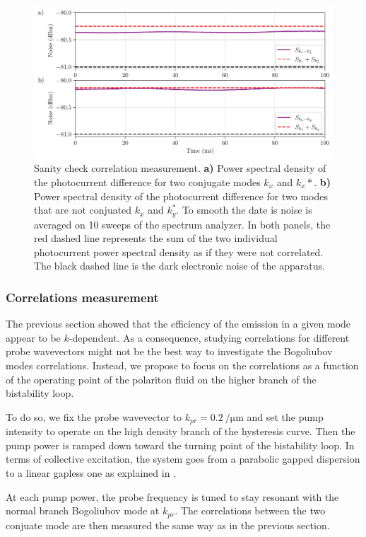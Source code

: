 \begin{figure}
    \centering
    \includegraphics[width=1\textwidth]{chap_correlation/fig/noise_comparison.pdf}
    \caption{Sanity check correlation measurement. \textbf{a)} Power spectral density of the photocurrent difference for two conjugate modes $k_x$ and $k_x*$. \textbf{b)} Power spectral density of the photocurrent difference for two modes that are not conjuated $k_x$ and $k_y^*$. To smooth 
    the date is noise is averaged on 10 sweeps of the spectrum analyzer. In both panels, the red dashed line represents the sum of the two individual photocurrent power spectral density as if they were not correlated. The black dashed line is the dark electronic noise of the apparatus.} 
    \label{fig:noise_comparison}
\end{figure}



\subsubsection{Correlations measurement}
\label{sec:exp_corr_measurement}

The previous section showed that the efficiency of the emission in a given mode appear to be $k$-dependent. As a consequence, studying correlations for different probe wavevectors might not be the best way to investigate the Bogoliubov modes correlations.
Instead, we propose to focus on the correlations as a function of the operating point of the polariton fluid on the higher branch of the bistability loop. 

To do so, we fix the probe wavevector to $k_{pr}=\SI{0.2}{\per\micro\meter}$ and set the pump intensity to operate on the high density branch of the hysteresis curve. Then the pump power is ramped down toward the turning point of the bistability loop.
In terms of collective excitation, the system goes from a parabolic gapped dispersion to a linear gapless one as explained in .

At each pump power, the probe frequency is tuned to stay resonant with the normal branch Bogoliubov mode at $k_{pr}$. The correlations between the two conjuate mode are then measured the same way as in the previous section. 

